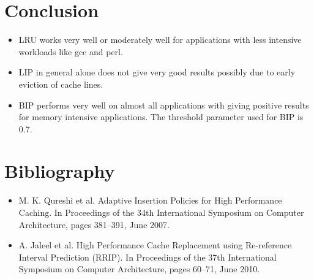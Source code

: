 \documentclass{article}
\begin{document}
\section{Conclusion}
\begin{itemize}
\item LRU works very well or moderately well for applications with less intensive workloads like gcc and perl.
\item LIP in general alone does not give very good results possibly due to early eviction of cache lines.
  \item BIP performs very well on almost all applications with giving positive results for memory intensive applications. The threshold parameter used for BIP is 0.7.
  \end{itemize}
  \section{Bibliography}
  \begin{itemize}
  \item M. K. Qureshi et al. Adaptive Insertion Policies for High Performance Caching. In Proceedings of the 34th International Symposium on Computer Architecture, pages 381–391, June 2007.
    \item A. Jaleel et al. High Performance Cache Replacement using Re-reference Interval Prediction (RRIP). In Proceedings of the 37th International Symposium on Computer Architecture, pages 60–71, June 2010.
    \end{itemize}
\end{document}
